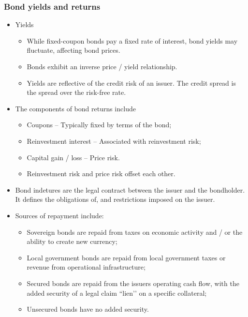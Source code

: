 \documentclass[../notes_compiled.tex]{subfiles}
\begin{document}
\subsubsection{Bond yields and returns}
\begin{itemize}
\item Yields
\begin{itemize}
\item While fixed-coupon bonds pay a fixed rate of interest, bond yields may fluctuate, affecting bond prices.
\item Bonds exhibit an inverse price / yield relationship.
\item Yields are reflective of the credit risk of an issuer. The credit spread is the spread over the risk-free rate.
\end{itemize}
\item The components of bond returns include
\begin{itemize}
\item Coupons -- Typically fixed by terms of the bond;
\item Reinvestment interest -- Associated with reinvestment risk;
\item Capital gain / loss -- Price risk.
\item[] Reinvestment risk and price risk offset each other.
\end{itemize}
\item Bond indetures are the legal contract between the issuer and the bondholder. It defines the obligations of, and restrictions imposed on the issuer.
\item Sources of repayment include:
\begin{itemize}
\item Sovereign bonds are repaid from taxes on economic activity and / or the ability to create new currency;
\item Local government bonds are repaid from local government taxes or revenue from operational infrastructure;
\item Secured bonds are repaid from the issuers operating cash flow, with the added security of a legal claim ``lien’’ on a specific collateral;
\item Unsecured bonds have no added security.
\end{itemize}
\end{itemize}
\end{document}
